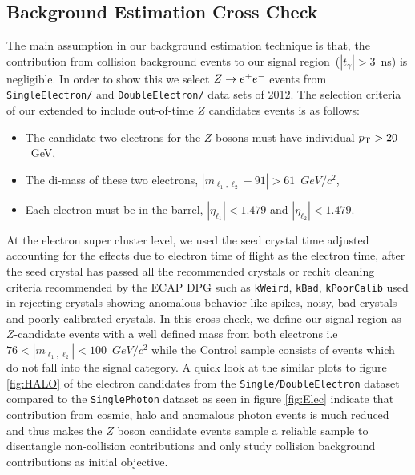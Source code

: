 \subsection{Background Estimation Cross Check}
The main assumption in our background estimation technique is that, the contribution from collision background events to our signal region~($|t_{\gamma}| > 3$~ns) is negligible.
In order to show this we select $Z\rightarrow e^+e^-$ events from \texttt{SingleElectron/} and \texttt{DoubleElectron/} data sets of 2012.
The selection criteria of our extended to include out-of-time $Z$ candidates events is as follows:
\begin{itemize}
\item The candidate two electrons for the $Z$ bosons must have individual $p_{\mathrm{T}} > 20$~GeV,
\item The di-mass of these two electrons, $|m_{\ell_{1}, \ell_{2}} - 91| > 61$~$GeV/c^{2}$,
\item Each electron must be in the barrel, $|\eta_{\ell_{1}}| < 1.479$ and $ |\eta_{\ell_{2}}| < 1.479$.
\end{itemize}
 At the electron super cluster level,  we used the seed crystal time adjusted accounting for the effects due to electron time of flight as the electron time, after the seed crystal has passed all the recommended crystals or rechit cleaning criteria recommended by the ECAP DPG such as \texttt{kWeird}, \texttt{kBad}, \texttt{kPoorCalib} used in rejecting crystals showing anomalous behavior like spikes, noisy, bad crystals and poorly calibrated crystals.
In this cross-check, we define our signal region as $Z$-candidate events with a well defined mass from both electrons i.e  $76 < |m_{\ell_{1}, \ell_{2}}| < 100$~$GeV/c^{2}$ while the Control sample consists of events which do not fall into the signal category.
A quick look at the similar plots to figure \ref{fig:HALO} of the electron candidates from the \texttt{Single/DoubleElectron} dataset compared to the \texttt{SinglePhoton} dataset as seen in figure \ref{fig:Elec} indicate that contribution from cosmic, halo and anomalous photon events is much reduced and thus makes the $Z$ boson candidate events sample a reliable sample to disentangle non-collision contributions and only study collision background contributions as initial objective.
